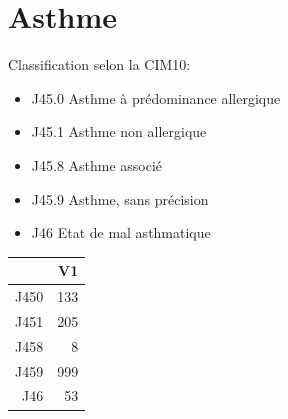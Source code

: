 \documentclass[12pt,english,french,twoside]{book}\usepackage[]{graphicx}\usepackage[]{color}
\begin{document}
\section{Asthme}

Classification selon la CIM10:
\begin{itemize}
  \item J45.0 Asthme à prédominance allergique
  \item J45.1 Asthme non allergique
  \item J45.8 Asthme associé 
  \item J45.9 Asthme, sans précision
  \item J46   Etat de mal asthmatique
\end{itemize}

\begin{table}[ht]
\centering
\begin{tabular}{rr}
  \hline
 & V1 \\ 
  \hline
J450 & 133 \\ 
  J451 & 205 \\ 
  J458 &   8 \\ 
  J459 & 999 \\ 
  J46 &  53 \\ 
   \hline
\end{tabular}
\end{table}
\end{document}
